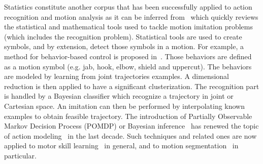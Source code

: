 \documentclass[letterpaper, 10pt, conference]{ieeeconf}      %
\begin{document}
%
Statistics constitute another corpus that has been successfully applied
to action recognition and motion analysis as it can be inferred 
from~\cite{schaal03} which quickly reviews the statistical and mathematical 
tools used to tackle motion imitation problems (which includes the recognition problem).
Statistical tools are used to create symbols, and by extension, detect those
symbols in a motion. For example, a method for behavior-based control 
is proposed in~\cite{drumwright03, drumwright04}. Those behaviors are defined 
as a motion symbol (e.g. jab, hook, elbow, shield and uppercut). 
The behaviors are modeled by learning from joint trajectories examples.
A dimensional reduction is then applied to have a significant
clusterization.  The recognition part is handled by a Bayesian classifier which
recognize a trajectory in joint or Cartesian space. An imitation can then be
performed by interpolating known examples to obtain feasible trajectory.  
The introduction of Partially
Observable Markov Decision Process (POMDP) or Bayesian inference~\cite{pearl88} has
renewed the topic of action modeling~\cite{kaelbling98} in the last decade. Such
techniques and related ones are now applied to motor skill learning~\cite{peters08} in
general, and to motion segmentation~\cite{calinon10, inamura04} in particular. 
\end{document}

